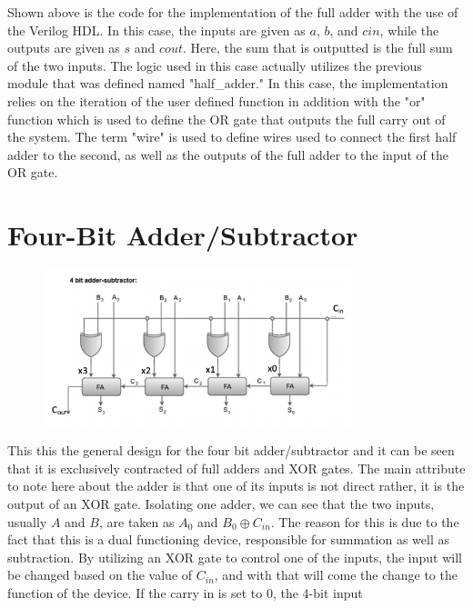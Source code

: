 \documentclass[12pt]{article}
\begin{document}
    \par Shown above is the code for the implementation of the full adder with
    the use of the Verilog HDL. In this case, the inputs are given as $a$, $b$,
    and $cin$, while the outputs are given as $s$ and $cout$. Here, the sum that
    is outputted is the full sum of the two inputs. The logic used in this case
    actually utilizes the previous module that was defined named "half\_adder."
    In this case, the implementation relies on the iteration of the user defined
    function in addition with the "or" function which is used to define the OR
    gate that outputs the full carry out of the system. The term "wire" is used
    to define wires used to connect the first half adder to the second, as well
    as the outputs of the full adder to the input of the OR gate.
    \section*{Four-Bit Adder/Subtractor}
    \begin{figure}[h]
        \centering
        \includegraphics[width=0.8\textwidth]{4-bit Adder-Subtractor Design.png}
    \end{figure}
    \par This this the general design for the four bit adder/subtractor and it
    can be seen that it is exclusively contracted of full adders and XOR gates.
    The main attribute to note here about the adder is that one of its inputs is
    not direct rather, it is the output of an XOR gate. Isolating one adder, we
    can see that the two inputs, usually $A$ and $B$, are taken as $A_0$ and
    $B_0 \oplus C_{in}$. The reason for this is due to the fact that this is a
    dual functioning device, responsible for summation as well as subtraction.
    By utilizing an XOR gate to control one of the inputs, the input will be
    changed based on the value of $C_{in}$, and with that will come the change
    to the function of the device. If the carry in is set to 0, the 4-bit input
\end{document}
